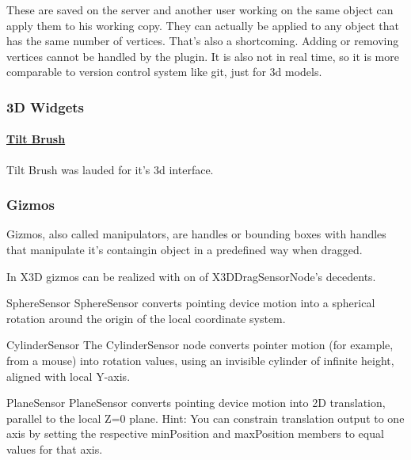 These are saved on the server and another user working on the same
object can apply them to his working copy. They can actually be applied
to any object that has the same number of vertices. That's also a
shortcoming. Adding or removing vertices cannot be handled by the
plugin. It is also not in real time, so it is more comparable to version
control system like git, just for 3d models.

\subsubsection{3D Widgets}\label{d-widgets}

\paragraph{\texorpdfstring{\href{http://www.tiltbrush.com/}{Tilt
Brush}}{Tilt Brush}}\label{tilt-brush20}

Tilt Brush was lauded for it's 3d interface.

\subsubsection{Gizmos}\label{gizmos}

Gizmos, also called manipulators, are handles or bounding boxes with
handles that manipulate it's containgin object in a predefined way when
dragged. \cite{wikigizmo}

In X3D gizmos can be realized with on of X3DDragSensorNode's \cite{x3ddragsensornode} decedents.

\begin{description*}
\item[SphereSensor]
  SphereSensor converts pointing device motion into a spherical rotation around the origin of the local coordinate system. \cite{spheresensor}
\item[CylinderSensor]
  The CylinderSensor node converts pointer motion (for example, from a mouse) into rotation values, using an invisible cylinder of infinite height, aligned with local Y-axis. \cite{cylindersensor}
\item[PlaneSensor]
  PlaneSensor converts pointing device motion into 2D translation, parallel to the local Z=0 plane. Hint: You can constrain translation output to one axis by setting the respective minPosition and maxPosition members to equal values for that axis.
  \cite{planesensor}
\end{description*}

